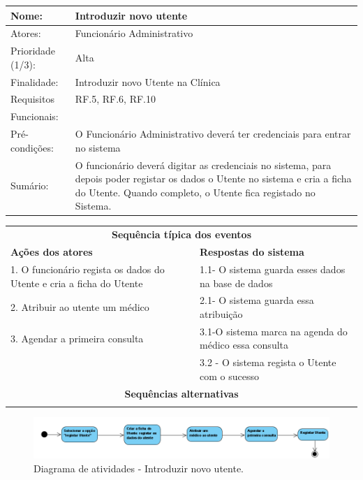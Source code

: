 \documentclass[11pt,a4paper,twoside]{report}
\begin{document}
\begin{center}
	\begin{tabularx}{\textwidth}{|lX|}
		\hline
		\textbf{Nome}: & \textbf{Introduzir novo utente} \\ \hline
		Atores: & Funcionário Administrativo  \\ \hline
		Prioridade (1/3): & Alta \\ \hline
		Finalidade: & Introduzir novo Utente na Clínica  \\ \hline
		Requisitos & RF.5, RF.6, RF.10   \\
		Funcionais: & \\
		Pré-condições: & O Funcionário Administrativo deverá ter credenciais para entrar no sistema    \\
		Sumário: & O funcionário deverá digitar as credenciais no sistema, para depois poder registar os dados o Utente no sistema e cria a ficha do Utente. Quando completo, o Utente fica registado no Sistema. \\
		\hline
	\end{tabularx}
	
	\begin{tabularx}{\textwidth}{|XX|}
		\hline
		\multicolumn{2}{|c|}{\textbf{Sequência típica dos eventos} }\\
		\textbf{Ações dos atores}  & \textbf{Respostas do sistema} \\
		1.     O funcionário regista os dados do Utente e cria a ficha do Utente   & 1.1-       O sistema guarda esses dados na base de dados   \\
		2.     Atribuir ao utente um médico   & 2.1-    O sistema guarda essa atribuição    \\
		3.      Agendar a primeira consulta   & 3.1-O sistema marca na agenda do médico essa consulta   \\
		&3.2 - O sistema regista o Utente com o sucesso  \\

		
		\hline
		\multicolumn{2}{|c|}{\textbf{Sequências alternativas } }\\
		\hline
		& \\
		 \hline
	\end{tabularx}
	
\end{center}

\begin{figure}[H]
	\centering
	\includegraphics[width=0.7\linewidth]{image/Atividades/Introduzir novo utente}
	\caption{Diagrama de atividades - Introduzir novo utente.}
	\label{fig:introduzirnovoutente}
\end{figure}
\end{document}
